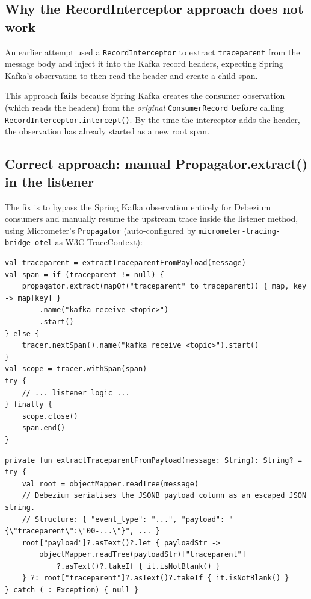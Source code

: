 \documentclass[11pt,a4paper]{article}
\begin{document}
\subsection{Why the RecordInterceptor approach does not work}

An earlier attempt used a \texttt{RecordInterceptor} to extract
\texttt{traceparent} from the message body and inject it into the Kafka record
headers, expecting Spring Kafka's observation to then read the header and create
a child span.

This approach \textbf{fails} because Spring Kafka creates the consumer
observation (which reads the headers) from the \emph{original}
\texttt{ConsumerRecord} \textbf{before} calling
\texttt{RecordInterceptor.intercept()}.  By the time the interceptor adds the
header, the observation has already started as a new root span.

\subsection{Correct approach: manual Propagator.extract() in the listener}

The fix is to bypass the Spring Kafka observation entirely for Debezium
consumers and manually resume the upstream trace inside the listener method,
using Micrometer's \texttt{Propagator} (auto-configured by
\texttt{micrometer-tracing-bridge-otel} as W3C TraceContext):

\begin{lstlisting}[style=kotlin, caption={Pattern used in both Debezium listeners}]
val traceparent = extractTraceparentFromPayload(message)
val span = if (traceparent != null) {
    propagator.extract(mapOf("traceparent" to traceparent)) { map, key -> map[key] }
        .name("kafka receive <topic>")
        .start()
} else {
    tracer.nextSpan().name("kafka receive <topic>").start()
}
val scope = tracer.withSpan(span)
try {
    // ... listener logic ...
} finally {
    scope.close()
    span.end()
}
\end{lstlisting}

\begin{lstlisting}[style=kotlin, caption={Debezium payload traceparent extraction}]
private fun extractTraceparentFromPayload(message: String): String? = try {
    val root = objectMapper.readTree(message)
    // Debezium serialises the JSONB payload column as an escaped JSON string.
    // Structure: { "event_type": "...", "payload": "{\"traceparent\":\"00-...\"}", ... }
    root["payload"]?.asText()?.let { payloadStr ->
        objectMapper.readTree(payloadStr)["traceparent"]
            ?.asText()?.takeIf { it.isNotBlank() }
    } ?: root["traceparent"]?.asText()?.takeIf { it.isNotBlank() }
} catch (_: Exception) { null }
\end{lstlisting}
\end{document}
